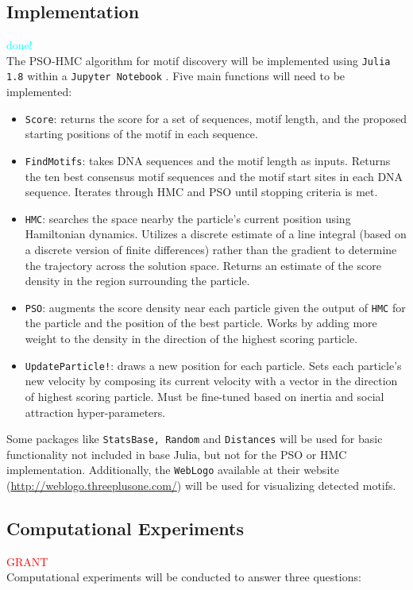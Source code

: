 \documentclass{article}
\begin{document}
\subsection{Implementation}
\textcolor{cyan}{done!} \\
The PSO-HMC algorithm for motif discovery will be implemented using \texttt{Julia 1.8} \cite{Julia-2017} within a  \texttt{Jupyter Notebook}  \cite{Kluyver2016jupyter}. Five main functions will need to be implemented:
\begin{itemize}
	\item \texttt{Score}: returns the score for a set of sequences, motif length, and the proposed starting positions of the motif in each sequence.
	\item \texttt{FindMotifs}: takes DNA sequences and the motif length as inputs. Returns the ten best consensus motif sequences and the motif start sites in each DNA sequence. Iterates through HMC and PSO until stopping criteria is met.
	\item \texttt{HMC}: searches the space nearby the particle's current position using Hamiltonian dynamics. Utilizes a discrete estimate of a line integral (based on a discrete version of finite differences) rather than the gradient to determine the trajectory across the solution space. Returns an estimate of the score density in the region surrounding the particle.
	\item \texttt{PSO}: augments the score density near each particle given the output of \texttt{HMC} for the particle and the position of the best particle. Works by adding more weight to the density in the direction of the highest scoring particle.
	\item \texttt{UpdateParticle!}: draws a new position for each particle. Sets each particle's new velocity by composing its current velocity with a vector in the direction of highest scoring particle. Must be fine-tuned based on inertia and social attraction hyper-parameters.
\end{itemize}
  Some packages like \texttt{StatsBase, Random} and \texttt{Distances} will be used for basic functionality not included in base Julia, but not for the PSO or HMC implementation. Additionally, the \texttt{WebLogo} available at their website (\url{http://weblogo.threeplusone.com/}) will be used for visualizing detected motifs.
\subsection{Computational Experiments}
\textcolor{red}{GRANT} \\
Computational experiments will be conducted to answer three questions:
\end{document}
